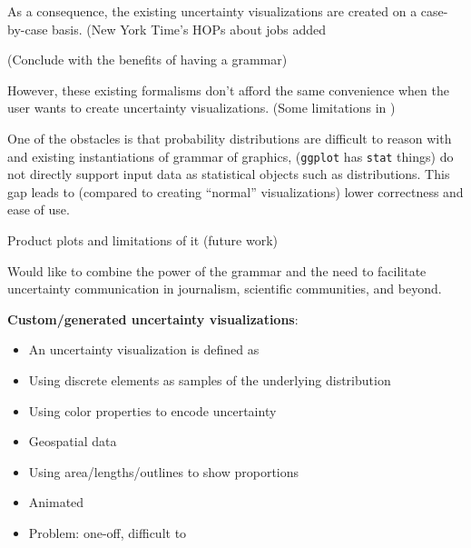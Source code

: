 \documentclass[11pt]{article}
\begin{document}
As a consequence, the existing uncertainty visualizations are created on a case-by-case basis. (New York Time's HOPs about jobs added \cite{neil_irwin_how_2014}



(Conclude with the benefits of having a grammar)

However, these existing formalisms don’t afford the same convenience when the user wants to create uncertainty visualizations. (Some limitations in \cite{Wickham2010layered_grammar})

One of the obstacles is that probability distributions are difficult to reason with and existing instantiations of grammar of graphics, (\texttt{ggplot} has \texttt{stat} things) do not directly support input data as statistical objects such as distributions. This gap leads to (compared to creating ``normal'' visualizations) lower correctness and ease of use.

Product plots and limitations of it \cite{wickham_product_2011} (future work)


Would like to combine the power of the grammar and the need to facilitate uncertainty communication in journalism, scientific communities, and beyond.







\noindent \textbf{Custom/generated uncertainty visualizations}:



\begin{itemize}
    \item An uncertainty visualization is defined as 
    \item Using discrete elements as samples of the underlying distribution \cite{kay2016bus, park2016gatherplots, Park2017}
    \item Using color properties to encode uncertainty \cite{lucchesi_visualizing_2017, Correll2018}
    \item Geospatial data \cite{lucchesi_visualizing_2017, liu2018visualizing}
    \item Using area/lengths/outlines to show proportions \cite{wickham_product_2011, Gortler2018}
    \item Animated \cite{hullman2015hops}
    \item Problem: one-off, difficult to 
\end{itemize}
\end{document}
